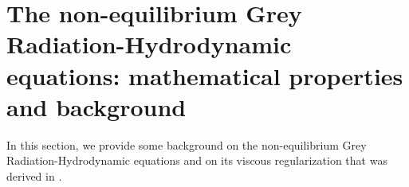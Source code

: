 \documentclass[times,doublespace]{fldauth}%
\begin{document}
\section{The non-equilibrium Grey Radiation-Hydrodynamic equations: mathematical properties and background}
\label{sec:GRH}
%
In this section, we provide some background on the non-equilibrium Grey Radiation-Hydrodynamic equations and on its viscous regularization that was derived in \cite{our_jcp_radhy_paper}.
%
%

\end{document}
